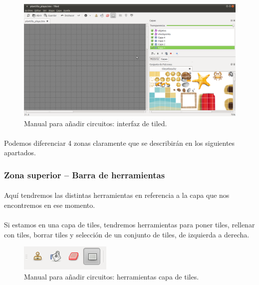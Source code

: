 \begin{figure}[H]
  \label{interfaz_tiled}
  \begin{flushleft}
    \includegraphics[scale=0.35]{imagenes/manualcircuito/interfaz_tiled.png}
  \end{flushleft}
  \caption{Manual para añadir circuitos: interfaz de tiled.}
\end{figure}

\paragraph{}
Podemos diferenciar 4 zonas claramente que se describirán en los siguientes apartados.

\subsubsection{Zona superior -- Barra de herramientas}

\paragraph{}
Aquí tendremos las distintas herramientas en referencia a la capa que nos encontremos en ese momento.

\paragraph{}
Si estamos en una capa de tiles, tendremos herramientas para poner tiles, rellenar con tiles, borrar tiles y selección de un 
conjunto de tiles, de izquierda a derecha.

\begin{figure}[H]
  \label{herramientas_tiles}
  \begin{center}
    \includegraphics[scale=1]{imagenes/manualcircuito/herramientas_tiles.png}
  \end{center}
  \caption{Manual para añadir circuitos: herramientas capa de tiles.}
\end{figure}

